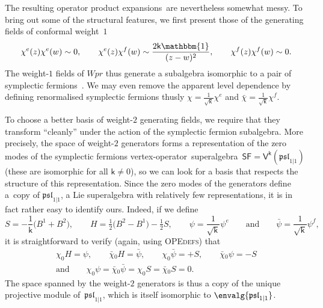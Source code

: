 \documentclass[10pt,a4paper]{amsart}
\numberwithin{equation}{section}
\newcommand{\wun}{\mathbbm{1}} %
\newcommand{\bchi}{\bar{\chi}{}} %
\newcommand{\bpsi}{\bar{\psi}{}} %
\newcommand{\kk}{\mathsf{k}} %
\newcommand{\alg}[1]{\mathfrak{#1}} %
\newcommand{\VOA}[1]{\mathsf{#1}} %
\newcommand{\SLSA}[3]{\alg{#1}_{#2 \vert #3}} %
\newcommand{\pslone}{\SLSA{psl}{1}{1}}
\newcommand{\sfsymb}{\VOA{SF}}
\newcommand{\sfvoa}{\sfsymb} %
\newcommand{\uaff}[2]{\VOA{V}^{#1}(#2)} %
\newcommand{\uwalg}[2]{\VOA{W}^{#1}_{\mathrm{#2}}} %
\newcommand{\upr}[1][\kk]{\uwalg{#1}{pr}} %
\newcommand{\vo}{vertex-operator}
\newcommand{\svoa}{\vo\ superalgebra}
\newcommand{\ope}{operator product expansion}
\newcommand{\opes}{\ope s}
\def\smash#1{#1}
\def\upr{Wpr}
\begin{document}
The resulting \opes\ are nevertheless somewhat messy.
To bring out some of the structural features, we first present those of the generating fields of conformal weight~$1$
\[
	\chi^e(z) \chi^e(w) \sim 0, \qquad \chi^e(z) \chi^f(w) \sim \frac{2\kk\wun}{(z-w)^2}, \qquad \chi^f(z) \chi^f(w) \sim 0.
\]
The weight-$1$ fields of \smash{$\upr$} thus generate a subalgebra isomorphic to a pair of symplectic fermions~\cite{KauSym00}.
We may even remove the apparent level dependence by defining renormalised symplectic fermions thusly
$\chi = \frac{1}{\sqrt{\kk}} \chi^e $ and $\bchi = \frac{1}{\sqrt{\kk}} \chi^f$.


To choose a better basis of weight-$2$ generating fields, we require that they transform ``cleanly'' under the action of the symplectic fermion subalgebra.
More precisely, the space of weight-$2$ generators forms a representation of the zero modes of the symplectic fermions \svoa\ $\sfvoa = \uaff{\kk}{\pslone}$ (these are isomorphic for all $\kk\ne0$), so we can look for a basis that respects the structure of this representation.
Since the zero modes of the generators define a~copy of $\pslone$, a Lie superalgebra with relatively few representations, it is in fact rather easy to identify ours.
Indeed, if we define
\[
	S = -\frac{1}{\kk}\big(B^1+B^2\big), \qquad H = \tfrac{1}{2}\big(B^2-B^1\big) - \tfrac{1}{2}S, \qquad
	\psi = \frac{1}{\sqrt{\kk}}\psi^e \qquad \text{and} \qquad \bpsi = \frac{1}{\sqrt{\kk}}\psi^f,
\]
it is straightforward to verify (again, using \textsc{OPEdefs}) that
\begin{gather*}
	\chi_0 H = \psi, \qquad \bchi_0 H = \bpsi, \qquad
	\chi_0 \bpsi = +S, \qquad \bchi_0 \psi = -S \\ \text{and} \qquad
	\chi_0 \psi = \bchi_0 \bpsi = \chi_0 S = \bchi_0 S = 0.
\end{gather*}
The space spanned by the weight-$2$ generators is thus a copy of the unique projective module of~$\pslone$, which is itself isomorphic to \smash{$\envalg{\pslone}$}.
\end{document}
